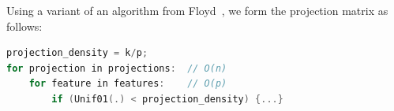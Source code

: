 \documentclass[sigconf,anonymous,review]{acmart}
\begin{document}
Using a variant of an algorithm from Floyd~\cite{10.1145/30401.315746}, we form the projection matrix as follows:

\begin{lstlisting}[language=c++]
projection_density = k/p;
for projection in projections:  // O(n)
    for feature in features:    // O(p)
        if (Unif01(.) < projection_density) {...}
\end{lstlisting}

%
%
%

\end{document}
